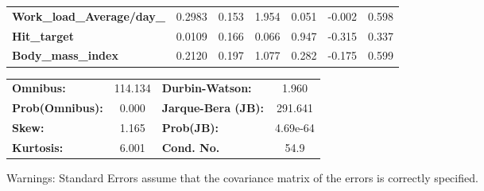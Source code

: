 \documentclass{report}
\begin{document}
\begin{center}
\begin{tabular}{lcccccc}
\textbf{Work\_load\_Average/day\_}           &       0.2983  &        0.153     &     1.954  &         0.051        &       -0.002    &        0.598     \\
\textbf{Hit\_target}                         &       0.0109  &        0.166     &     0.066  &         0.947        &       -0.315    &        0.337     \\
\textbf{Body\_mass\_index}                   &       0.2120  &        0.197     &     1.077  &         0.282        &       -0.175    &        0.599     \\
\bottomrule
\end{tabular}
\begin{tabular}{lclc}
\textbf{Omnibus:}       & 114.134 & \textbf{  Durbin-Watson:     } &    1.960  \\
\textbf{Prob(Omnibus):} &   0.000 & \textbf{  Jarque-Bera (JB):  } &  291.641  \\
\textbf{Skew:}          &   1.165 & \textbf{  Prob(JB):          } & 4.69e-64  \\
\textbf{Kurtosis:}      &   6.001 & \textbf{  Cond. No.          } &     54.9  \\
\bottomrule
\end{tabular}
\end{center}

Warnings: \newline
 [1] Standard Errors assume that the covariance matrix of the errors is correctly specified.
\end{document}
